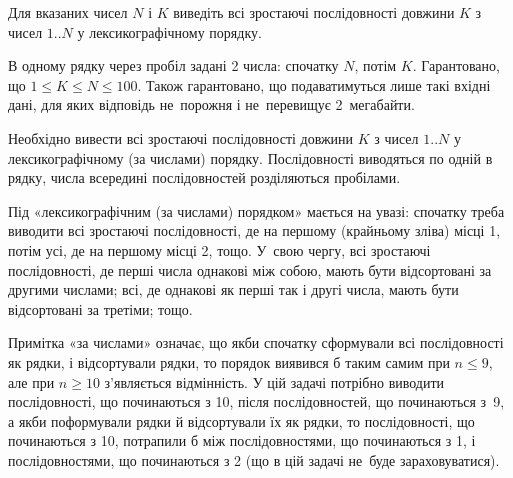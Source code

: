 ﻿Для вказаних чисел $N$ і $K$ виведіть всі зростаючі послідовності довжини $K$ з чисел $1..N$ у лексикографічному порядку.

\InputFile
В одному рядку через пробіл задані 2 числа: спочатку $N$, потім $K$. Гарантовано, що $1\leqslant K\leqslant N\leqslant 100$. Також гарантовано, що подаватимуться лише такі вхідні дані, для яких відповідь не~порожня і не~перевищує 2~мегабайти.

\OutputFile
Необхідно вивести всі зростаючі послідовності довжини $K$ з чисел $1..N$ у лексикографічному (за числами) порядку. Послідовності виводяться по одній в рядку, числа всередині послідовностей розділяються пробілами.

\Examples
\begin{example}
\end{example}

\Note

Під «лексикографічним (за числами) порядком» мається на увазі: спочатку треба виводити всі зростаючі послідовності, де на першому (крайньому зліва) місці 1, потім усі, де на першому місці 2, тощо. У~свою чергу, всі зростаючі послідовності, де перші числа однакові між собою, мають бути відсортовані за другими числами; всі, де однакові як перші так і другі числа, мають бути відсортовані за третіми; тощо.

Примітка «за числами» означає, що якби спочатку сформували всі послідовності як рядки, і відсортували рядки, то порядок виявився б таким самим при $n\leqslant 9$, але при $n\geqslant 10$ з'являється відмінність. У цій задачі потрібно виводити послідовності, що починаються з 10, після послідовностей, що починаються з~9, а якби поформували рядки й відсортували їх як рядки, то послідовності, що починаються з 10, потрапили б між послідовностями, що починаються з 1, і послідовностями, що починаються з 2 (що в цій задачі не~буде зараховуватися).

